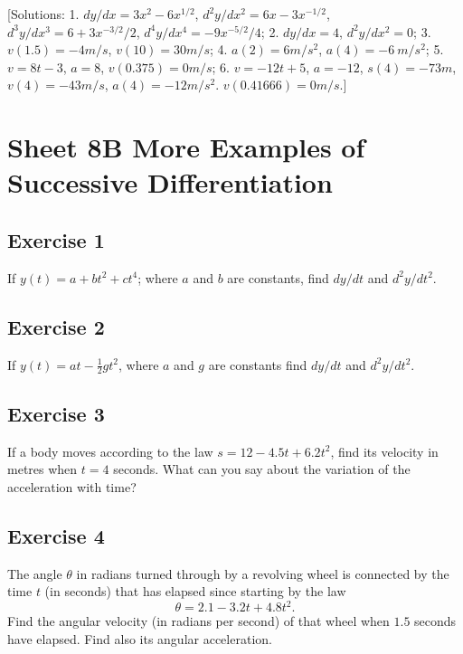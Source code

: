 \documentclass[
  11pt,
  oneside]{book}
\newcommand{\slide}{}
\theoremstyle{definition}
\theoremstyle{definition}
\theoremstyle{definition}
\theoremstyle{definition}
\theoremstyle{remark}
\begin{document}
{[}Solutions: 1. \(dy/dx=3x^2-6x^{1/2}\), \(d^2y/dx^2=6x-3x^{-1/2}\), \(d^3y/dx^3=6+3x^{-3/2}/2\), \(d^4y/dx^4=-9x^{-5/2}/4\); 2. \(dy/dx=4\), \(d^2y/dx^2=0\); 3. \(v(1.5) = -4m/s\), \(v(10) = 30m/s\); 4. \(a(2) = 6m/s^2\), \(a(4) = -6\ m/s^2\); 5. \(v=8t-3\), \(a=8\), \(v(0.375)=0m/s\); 6. \(v = -12t+5\), \(a=-12\), \(s(4) = -73m\), \(v(4)=-43m/s\), \(a(4)=-12m/s^2\). \(v(0.41666)=0m/s\).{]}
\slide

\section{Sheet 8B More Examples of Successive Differentiation}\label{sheet-8b-more-examples-of-successive-differentiation}

\subsection*{Exercise 1}\label{exercise-1-3}

If \(y(t) = a + bt^2 + ct^4\); where \(a\) and \(b\) are constants, find \(dy/dt\) and \(d^2y/dt^2\).

\slide

\subsection*{Exercise 2}\label{exercise-2-3}

If \(y(t) = at -\frac 12gt^2\), where \(a\) and \(g\) are constants find \(dy/dt\) and \(d^2y/dt^2\).

\slide

\subsection*{Exercise 3}\label{exercise-3-2}

If a body moves according to the law \(s = 12 - 4.5t + 6.2t^2\), find its velocity in metres when \(t = 4\) seconds. What can you say about the variation of the acceleration with time?

\slide

\subsection*{Exercise 4}\label{exercise-4-2}

The angle \(\theta\) in radians turned through by a revolving wheel is connected by the time \(t\) (in seconds) that has elapsed since starting by the law
\[
\theta = 2.1 - 3.2t + 4.8t^2.
\]
Find the angular velocity (in radians per second) of that wheel when \(1.5\) seconds have elapsed. Find also its angular acceleration.
\end{document}
